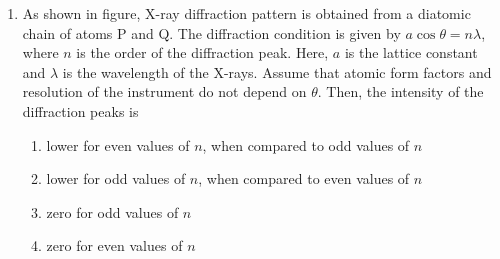\documentclass[journal]{IEEEtran}
\begin{document}
\begin{enumerate}
\item As shown in figure, X-ray diffraction pattern is obtained from a diatomic chain of atoms P and Q. The diffraction condition is given by $a \cos{\theta} = n \lambda$, where $n$ is the order of the diffraction peak. Here, $a$ is the lattice constant and $\lambda$ is the wavelength of the X-rays. Assume that atomic form factors and resolution of the instrument do not depend on $\theta$. Then, the intensity of the diffraction peaks is
\begin{multicols}{2}
    \begin{enumerate}
        \item lower for even values of $n$, when compared to odd values of $n$
        \item lower for odd values of $n$, when compared to even values of $n$
        \item zero for odd values of $n$
        \item zero for even values of $n$
    \end{enumerate}
\end{multicols}
\end{enumerate}
\end{document}
